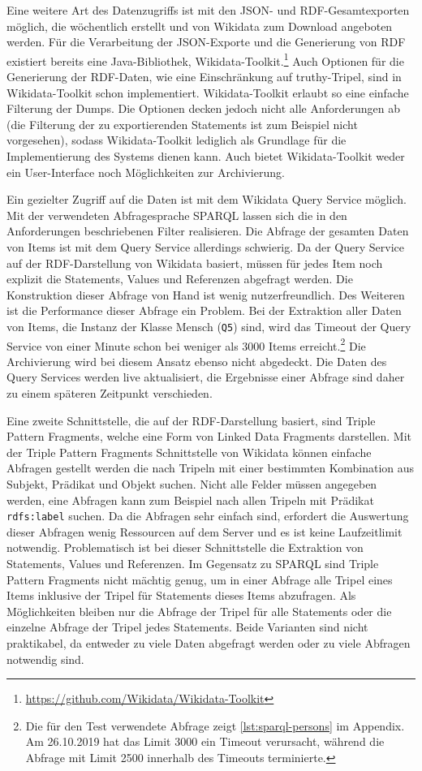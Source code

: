 Eine weitere Art des Datenzugriffs ist mit den JSON- und RDF-Gesamtexporten möglich, die wöchentlich erstellt und von Wikidata zum Download angeboten werden.
Für die Verarbeitung der JSON-Exporte und die Generierung von RDF existiert bereits eine Java-Bibliothek, Wikidata-Toolkit.\footnote{\url{https://github.com/Wikidata/Wikidata-Toolkit}}
Auch Optionen für die Generierung der RDF-Daten, wie eine Einschränkung auf truthy-Tripel, sind in Wikidata-Toolkit schon implementiert.
Wikidata-Toolkit erlaubt so eine einfache Filterung der Dumps.
Die Optionen decken jedoch nicht alle Anforderungen ab (die Filterung der zu exportierenden Statements ist zum Beispiel nicht vorgesehen), sodass Wikidata-Toolkit lediglich als Grundlage für die Implementierung des Systems dienen kann.
Auch bietet Wikidata-Toolkit weder ein User-Interface noch Möglichkeiten zur Archivierung.

Ein gezielter Zugriff auf die Daten ist mit dem Wikidata Query Service \cite{wd-sparql} möglich.
Mit der verwendeten Abfragesprache SPARQL \cite{sparql} lassen sich die in den Anforderungen beschriebenen Filter realisieren.
Die Abfrage der gesamten Daten von Items ist mit dem Query Service allerdings schwierig.
Da der Query Service auf der RDF-Darstellung von Wikidata basiert, müssen für jedes Item noch explizit die Statements, Values und Referenzen abgefragt werden.
Die Konstruktion dieser Abfrage von Hand ist wenig nutzerfreundlich.
Des Weiteren ist die Performance dieser Abfrage ein Problem.
Bei der Extraktion aller Daten von Items, die Instanz der Klasse Mensch (\verb|Q5|) sind, wird das Timeout der Query Service von einer Minute schon bei weniger als 3000 Items erreicht.\footnote{Die für den Test verwendete Abfrage zeigt \cref{lst:sparql-persons} im Appendix. Am 26.10.2019 hat das Limit 3000 ein Timeout verursacht, während die Abfrage mit Limit 2500 innerhalb des Timeouts terminierte.}
Die Archivierung wird bei diesem Ansatz ebenso nicht abgedeckt.
Die Daten des Query Services werden live aktualisiert, die Ergebnisse einer Abfrage sind daher zu einem späteren Zeitpunkt verschieden.

Eine zweite Schnittstelle, die auf der RDF-Darstellung basiert, sind Triple Pattern Fragments, welche eine Form von Linked Data Fragments \cite{ldf} darstellen.
Mit der Triple Pattern Fragments Schnittstelle von Wikidata können einfache Abfragen gestellt werden die nach Tripeln mit einer bestimmten Kombination aus Subjekt, Prädikat und Objekt suchen.
Nicht alle Felder müssen angegeben werden, eine Abfragen kann zum Beispiel nach allen Tripeln mit Prädikat \verb|rdfs:label| suchen.
Da die Abfragen sehr einfach sind, erfordert die Auswertung dieser Abfragen wenig Ressourcen auf dem Server und es ist keine Laufzeitlimit notwendig.
Problematisch ist bei dieser Schnittstelle die Extraktion von Statements, Values und Referenzen.
Im Gegensatz zu SPARQL sind Triple Pattern Fragments nicht mächtig genug, um in einer Abfrage alle Tripel eines Items inklusive der Tripel für Statements dieses Items abzufragen.
Als Möglichkeiten bleiben nur die Abfrage der Tripel für alle Statements oder die einzelne Abfrage der Tripel jedes Statements.
Beide Varianten sind nicht praktikabel, da entweder zu viele Daten abgefragt werden oder zu viele Abfragen notwendig sind.

